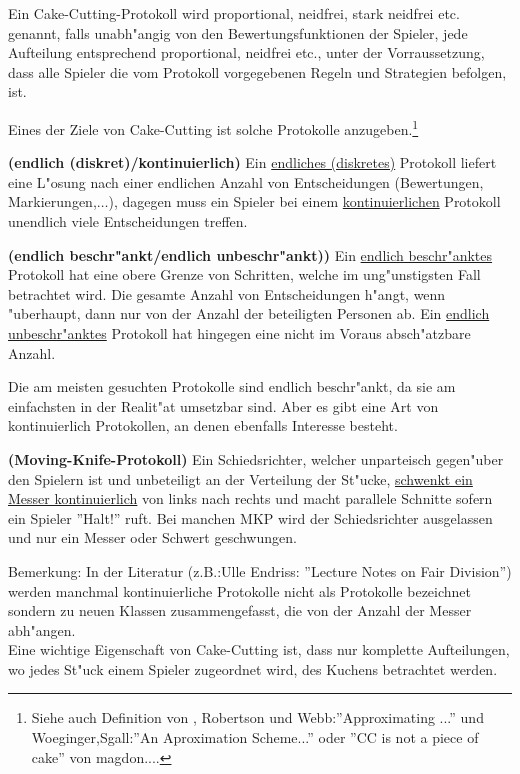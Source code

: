 \begin{defi}
Ein Cake-Cutting-Protokoll wird proportional, neidfrei, stark neidfrei etc.
genannt, falls unabh"angig von den Bewertungsfunktionen der Spieler, jede
Aufteilung entsprechend proportional, neidfrei etc., unter der Vorraussetzung,
dass alle Spieler die vom Protokoll vorgegebenen Regeln und Strategien befolgen,
ist.
\end{defi}
Eines der Ziele von Cake-Cutting ist solche Protokolle anzugeben.\footnote{Siehe
auch Definition von \cite{3}, Robertson und Webb:''Approximating ...'' und
Woeginger,Sgall:''An Aproximation Scheme...'' oder
''CC is not a piece of cake'' von
magdon....}
\begin{defi}{\textbf{(endlich (diskret)/kontinuierlich)}}
\newline Ein \underline{endliches (diskretes)} Protokoll liefert eine L"osung
nach einer endlichen Anzahl von Entscheidungen (Bewertungen,
Markierungen,$\ldots$), dagegen muss ein Spieler bei einem
\underline{kontinuierlichen} Protokoll unendlich viele Entscheidungen treffen.
\end{defi}
\begin{defi}{\textbf{(endlich beschr"ankt/endlich unbeschr"ankt))}}
\newline Ein \underline{endlich beschr"anktes} Protokoll hat eine obere Grenze
von Schritten, welche im ung"unstigsten Fall betrachtet wird. Die gesamte Anzahl
von Entscheidungen h"angt, wenn "uberhaupt, dann nur von der Anzahl der
beteiligten Personen ab. Ein \underline{endlich unbeschr"anktes} Protokoll hat
hingegen eine nicht im Voraus absch"atzbare Anzahl.
\end{defi}
Die am meisten gesuchten Protokolle sind endlich beschr"ankt, da sie am
einfachsten in der Realit"at umsetzbar sind. Aber es gibt eine Art von
kontinuierlich Protokollen, an denen ebenfalls Interesse besteht.
\begin{defi}{\textbf{(Moving-Knife-Protokoll)}}
\newline Ein Schiedsrichter, welcher unparteisch gegen"uber den Spielern ist und
unbeteiligt an der Verteilung der St"ucke, \underline{schwenkt ein Messer
kontinuierlich} von links nach rechts und macht parallele Schnitte sofern ein
Spieler ''Halt!'' ruft. Bei manchen
MKP wird der
Schiedsrichter ausgelassen und nur ein Messer oder Schwert geschwungen.
\end{defi}
Bemerkung: In der Literatur (z.B.:Ulle Endriss:\cite{10} ''Lecture Notes on Fair
Division'') werden manchmal kontinuierliche Protokolle nicht als Protokolle
bezeichnet sondern zu neuen Klassen zusammengefasst, die von der Anzahl der
Messer abh"angen.\\
\newline
 Eine wichtige Eigenschaft von Cake-Cutting ist, dass nur komplette
Aufteilungen, wo jedes St"uck einem Spieler zugeordnet wird, des Kuchens
betrachtet werden.

